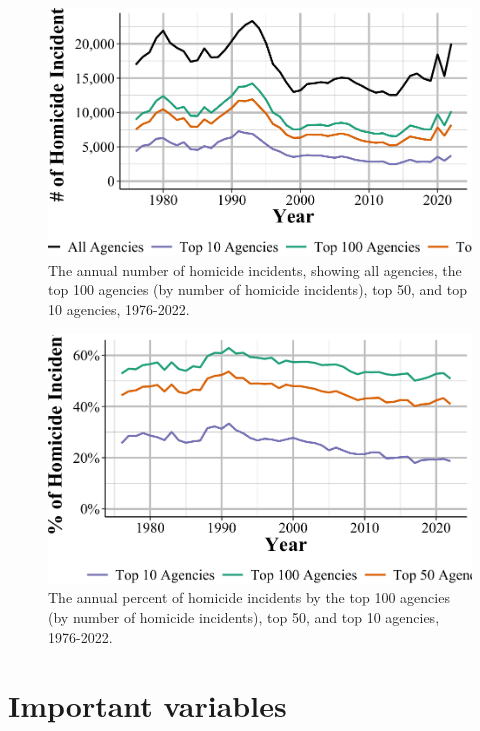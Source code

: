 \documentclass[
  12pt,
  openany]{book}
\begin{document}
\begin{figure}

{\centering \includegraphics[width=0.9\linewidth]{06_shr_files/figure-latex/shrTopAgenciesCount-1} 

}

\caption{The annual number of homicide incidents, showing all agencies, the top 100 agencies (by number of homicide incidents), top 50, and top 10 agencies, 1976-2022.}\label{fig:shrTopAgenciesCount}
\end{figure}

\begin{figure}

{\centering \includegraphics[width=0.9\linewidth]{06_shr_files/figure-latex/shrTopAgenciesCountPercent-1} 

}

\caption{The annual percent of homicide incidents by the top 100 agencies (by number of homicide incidents), top 50, and top 10 agencies, 1976-2022.}\label{fig:shrTopAgenciesCountPercent}
\end{figure}

\section{Important variables}\label{important-variables-3}
\end{document}

